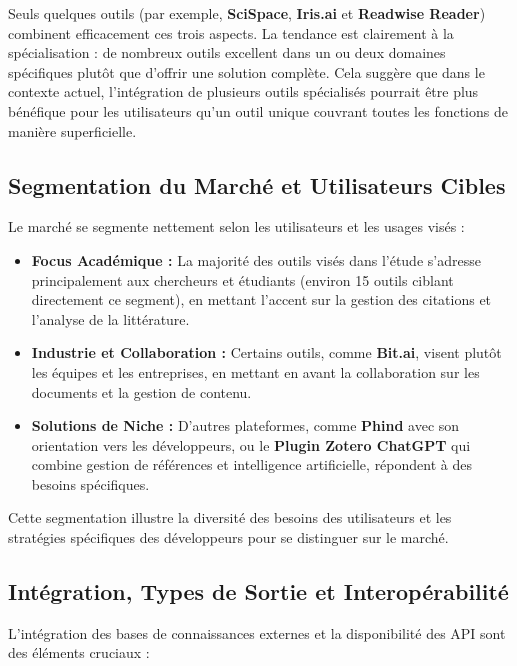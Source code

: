 \documentclass[a4paper,11pt]{report}
\providecommand{\tightlist}{\setlength{\itemsep}{0pt}\setlength{\parskip}{0pt}}
\begin{document}
Seuls quelques outils (par exemple, \textbf{SciSpace}, \textbf{Iris.ai} et \textbf{Readwise Reader}) combinent efficacement ces trois aspects. La tendance est clairement à la spécialisation : de nombreux outils excellent dans un ou deux domaines spécifiques plutôt que d'offrir une solution complète. Cela suggère que dans le contexte actuel, l'intégration de plusieurs outils spécialisés pourrait être plus bénéfique pour les utilisateurs qu'un outil unique couvrant toutes les fonctions de manière superficielle.

\subsection{Segmentation du Marché et Utilisateurs Cibles}\label{segmentation-du-marchuxe9-et-utilisateurs-cibles}

Le marché se segmente nettement selon les utilisateurs et les usages visés :

\begin{itemize}
\tightlist
\item
  \textbf{Focus Académique :} La majorité des outils visés dans l'étude s'adresse principalement aux chercheurs et étudiants (environ 15 outils ciblant directement ce segment), en mettant l'accent sur la gestion des citations et l'analyse de la littérature.
\item
  \textbf{Industrie et Collaboration :} Certains outils, comme \textbf{Bit.ai}, visent plutôt les équipes et les entreprises, en mettant en avant la collaboration sur les documents et la gestion de contenu.
\item
  \textbf{Solutions de Niche :} D'autres plateformes, comme \textbf{Phind} avec son orientation vers les développeurs, ou le \textbf{Plugin Zotero ChatGPT} qui combine gestion de références et intelligence artificielle, répondent à des besoins spécifiques.
\end{itemize}

Cette segmentation illustre la diversité des besoins des utilisateurs et les stratégies spécifiques des développeurs pour se distinguer sur le marché.

\subsection{Intégration, Types de Sortie et Interopérabilité}\label{intuxe9gration-types-de-sortie-et-interopuxe9rabilituxe9}

L'intégration des bases de connaissances externes et la disponibilité des API sont des éléments cruciaux :
\end{document}
